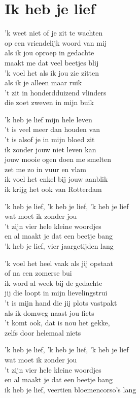 \section{Ik heb je lief}

'k weet niet of je zit te wachten\\
op een vriendelijk woord van mij\\
als ik jou oproep in gedachte\\
maakt me dat veel beetjes blij\\
'k voel het als ik jou zie zitten\\
als ik je alleen maar ruik\\
't zit in honderdduizend vlinders\\
die zoet zweven in mijn buik

'k heb je lief mijn hele leven\\
't is veel meer dan houden van\\
't is alsof je in mijn bloed zit\\
ik zonder jouw niet leven kan\\
jouw mooie ogen doen me smelten\\
zet me zo in vuur en vlam\\
ik voel het enkel bij jouw aanblik\\
ik krijg het ook van Rotterdam

'k heb je lief, 'k heb je lief, 'k heb je lief\\
wat moet ik zonder jou\\
't zijn vier hele kleine woordjes\\
en al maakt je dat een beetje bang\\
'k heb je lief, vier jaargetijden lang

'k voel het heel vaak als jij opstaat\\
of na een zomerse bui\\
ik word al week bij de gedachte\\
jij die loopt in mijn lievelingstrui\\
't is mijn hand die jij plots vastpakt\\
als ik domweg naast jou fiets\\
't komt ook, dat is nou het gekke,\\
zelfs door helemaal niets

'k heb je lief, 'k heb je lief, 'k heb je lief\\
wat moet ik zonder jou\\
't zijn vier hele kleine woordjes\\
en al maakt je dat een beetje bang\\
ik heb je lief, veertien bloemencorso's lang

